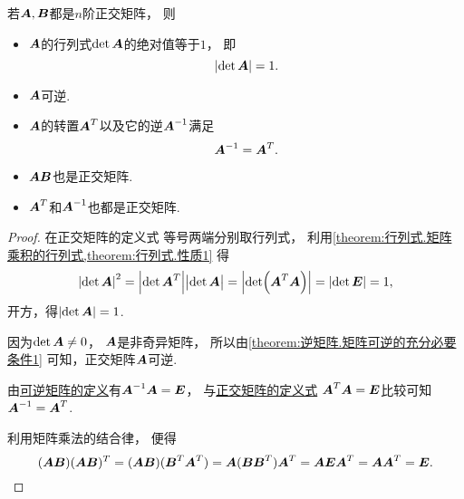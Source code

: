 \begin{property}
若\(\boldsymbol{A},\boldsymbol{B}\)都是\(n\)阶正交矩阵，
则\begin{itemize}
	\item \(\boldsymbol{A}\)的行列式\(\det\boldsymbol{A}\)的绝对值等于\(1\)，
	即\begin{equation}\label{equation:正交矩阵.正交矩阵的行列式}
		\abs{\det\boldsymbol{A}}=1.
	\end{equation}

	\item \(\boldsymbol{A}\)可逆.

	\item \(\boldsymbol{A}\)的转置\(\boldsymbol{A}^T\)以及它的逆\(\boldsymbol{A}^{-1}\)满足
	\begin{equation}\label{equation:正交矩阵.正交矩阵的转置等于正交矩阵的逆}
		\boldsymbol{A}^{-1}=\boldsymbol{A}^T.
	\end{equation}

	\item \(\boldsymbol{A}\boldsymbol{B}\)也是正交矩阵.

	\item \(\boldsymbol{A}^T\)和\(\boldsymbol{A}^{-1}\)也都是正交矩阵.
\end{itemize}
\begin{proof}
在正交矩阵的定义式  等号两端分别取行列式，
利用\cref{theorem:行列式.矩阵乘积的行列式,theorem:行列式.性质1} 得\begin{equation*}
	\abs{\det\boldsymbol{A}}^2
	=\abs{\det\boldsymbol{A}^T} \abs{\det\boldsymbol{A}\vphantom{^T}}
	=\abs{\det(\boldsymbol{A}^T \boldsymbol{A})}
	=\abs{\det\boldsymbol{E}}
	=1,
\end{equation*}
开方，得\(\abs{\det\boldsymbol{A}}=1\).

因为\(\det\boldsymbol{A}\neq0\)，
\(\boldsymbol{A}\)是非奇异矩阵，
所以由\cref{theorem:逆矩阵.矩阵可逆的充分必要条件1} 可知，正交矩阵\(\boldsymbol{A}\)可逆.

由\hyperref[definition:可逆矩阵.可逆矩阵的定义]{可逆矩阵的定义}有\(\boldsymbol{A}^{-1}\boldsymbol{A}=\boldsymbol{E}\)，
与\hyperref[equation:正交矩阵.正交矩阵的定义式]{正交矩阵的定义式}
\(\boldsymbol{A}^T\boldsymbol{A}=\boldsymbol{E}\)比较可知\(\boldsymbol{A}^{-1}=\boldsymbol{A}^T\).

利用矩阵乘法的结合律，
便得\begin{equation*}
	(\boldsymbol{A}\boldsymbol{B})(\boldsymbol{A}\boldsymbol{B})^T
	= (\boldsymbol{A}\boldsymbol{B})(\boldsymbol{B}^T\boldsymbol{A}^T)
	= \boldsymbol{A}(\boldsymbol{B}\boldsymbol{B}^T)\boldsymbol{A}^T
	= \boldsymbol{A}\boldsymbol{E}\boldsymbol{A}^T
	= \boldsymbol{A}\boldsymbol{A}^T
	= \boldsymbol{E}.
	\qedhere
\end{equation*}
\end{proof}
\end{property}

